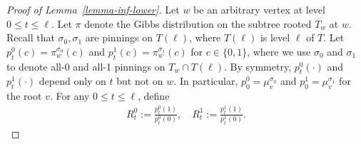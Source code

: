 \documentclass[10pt,a4paper]{article}
\newcommand{\defeq}{:=}
\begin{document}
\begin{proof}[Proof of Lemma~\ref{lemma-inf-lower}]
Let $w$ be an arbitrary vertex at level $0 \leq t \leq \ell$. 
Let $\pi$ denote the Gibbs distribution on the subtree rooted $T_w$ at $w$.
Recall that $\sigma_0,\sigma_1$ are pinnings on $T(\ell)$, where $T(\ell)$ is level $\ell$ of $T$.
Let $p^0_t(c) = \pi^{\sigma_0}_w(c)$ and $p^1_t(c) = \pi^{\sigma_1}_w(c)$ for $c \in \{0,1\}$, where we use $\sigma_{0}$ and $\sigma_1$ to denote all-0 and all-1 pinnings on $T_w \cap T(\ell)$.  By symmetry, $p^0_t(\cdot)$ and $p^1_t(\cdot)$ depend only on $t$ but not on $w$. In particular, $p^0_0 = \mu_v^{\sigma_0}$ and $p^1_0 = \mu_v^{\sigma_1}$ for the root $v$. For any $0 \leq t \leq \ell$, define
\begin{align*}
	R^0_t \defeq \frac{p^0_t(1)}{p^0_t(0)}, \quad R^1_t \defeq \frac{p^1_t(1)}{p^1_t(0)}.
\end{align*}


\end{proof}
\end{document}
